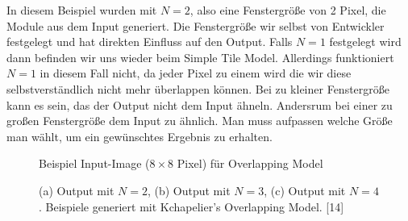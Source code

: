 \documentclass[12pt]{report}
\begin{document}
In diesem Beispiel wurden mit $N = 2$, also eine Fenstergröße von 2 Pixel, die Module aus dem Input generiert.
Die Fenstergröße wir selbst von Entwickler festgelegt und hat direkten Einfluss auf den Output.
Falls $N = 1$ festgelegt wird dann befinden wir uns wieder beim Simple Tile Model.
Allerdings funktioniert $N = 1$ in diesem Fall nicht, da jeder Pixel zu einem  wird die wir diese selbstverständlich nicht mehr überlappen können.
Bei zu kleiner Fenstergröße kann es sein, das der Output nicht dem Input ähneln.
Andersrum bei einer zu großen Fenstergröße dem Input zu ähnlich.
Man muss aufpassen welche Größe man wählt, um ein gewünschtes Ergebnis zu erhalten.

\begin{figure}[H]
    \centering
    \caption{Beispiel Input-Image ($8\times8$ Pixel) für Overlapping Model}%
\end{figure}

\begin{figure}[H]
    \centering
    \qquad
    \qquad
    \caption{(a) Output mit $N = 2$, (b) Output mit $N = 3$, (c) Output mit $N = 4$. Beispiele generiert mit Kchapelier's Overlapping Model. [14]}%
\end{figure}
\end{document}
